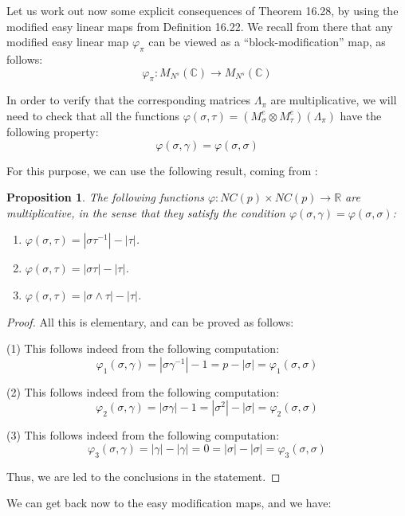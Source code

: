 \documentclass[12pt]{amsbook}
\newtheorem{proposition}[theorem]{Proposition}
\begin{document}
Let us work out now some explicit consequences of Theorem 16.28, by using the modified easy linear maps from Definition 16.22. We recall from there that any modified easy linear map $\varphi_\pi$ can be viewed as a ``block-modification'' map, as follows:
$$\varphi_\pi:M_{N^s}(\mathbb C)\to M_{N^s}(\mathbb C)$$

In order to verify that the corresponding matrices $\Lambda_\pi$ are multiplicative, we will need to check that all the functions $\varphi(\sigma,\tau)=(M_\sigma^e\otimes M_\tau^e)(\Lambda_\pi)$ have the following property:
$$\varphi(\sigma,\gamma)=\varphi(\sigma,\sigma)$$

For this purpose, we can use the following result, coming from \cite{bn2}:

\begin{proposition}
The following functions $\varphi:NC(p)\times NC(p)\to\mathbb R$ are multiplicative, in the sense that they satisfy the condition $\varphi(\sigma,\gamma)=\varphi(\sigma,\sigma)$:
\begin{enumerate}
\item $\varphi(\sigma,\tau)=|\sigma\tau^{-1}|-|\tau|$.

\item $\varphi(\sigma,\tau)=|\sigma\tau|-|\tau|$.

\item $\varphi(\sigma,\tau)=|\sigma\wedge\tau|-|\tau|$.
\end{enumerate}
\end{proposition}

\begin{proof}
All this is elementary, and can be proved as follows:

\medskip

(1) This follows indeed from the following computation:
$$\varphi_1(\sigma,\gamma)
=|\sigma\gamma^{-1}|-1
=p-|\sigma|
=\varphi_1(\sigma,\sigma)$$

(2) This follows indeed from the following computation:
$$\varphi_2(\sigma,\gamma)
=|\sigma\gamma|-1
=|\sigma^2|-|\sigma|
=\varphi_2(\sigma,\sigma)$$

(3) This follows indeed from the following computation:
$$\varphi_3(\sigma,\gamma)
=|\gamma|-|\gamma|
=0
=|\sigma|-|\sigma|
=\varphi_3(\sigma,\sigma)$$

Thus, we are led to the conclusions in the statement.
\end{proof}

We can get back now to the easy modification maps, and we have:
\end{document}
